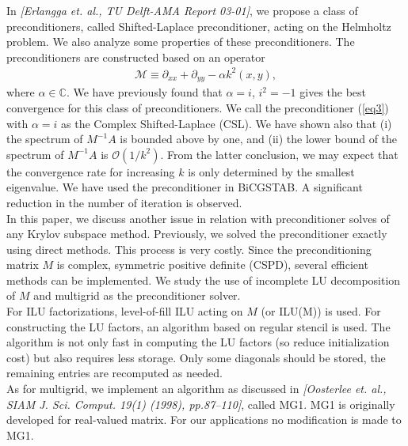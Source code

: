 \documentclass{report}
\begin{document}
In {\it [Erlangga et. al., TU Delft-AMA Report 03-01]}, we propose a
class of preconditioners, called Shifted-Laplace preconditioner, acting
on the Helmholtz problem. We also analyze some properties of these
preconditioners. The preconditioners are constructed based on an operator
\begin{eqnarray}
\mathcal{M} \equiv \partial_{xx} + \partial_{yy} - \alpha k^2(x,y), \label{eq3}
\end{eqnarray}
where $\alpha \in \mathbb{C}$. We have previously found that $\alpha =
i$, $i^2 = -1$ gives the best convergence for this class of
preconditioners. We call the preconditioner (\ref{eq3}) with $\alpha = i$
as the Complex Shifted-Laplace (CSL). We have shown also that (i) the
spectrum of $M^{-1}A$ is bounded above by one, and (ii) the lower bound
of the spectrum of $M^{-1}A$ is $\mathcal{O}(1/k^2)$. From the latter
conclusion, we may expect that the convergence rate for increasing $k$ is
only determined by the smallest eigenvalue. We have used the
preconditioner in BiCGSTAB. A significant reduction in the number of
iteration is observed. \\

In this paper, we discuss another issue in relation with preconditioner
solves of any Krylov subspace method. Previously, we solved the
preconditioner exactly using direct methods. This process is very costly.
Since the preconditioning matrix $M$ is complex, symmetric positive
definite (CSPD), several efficient methods can be implemented. We study
the use of incomplete LU decomposition of $M$ and multigrid as the
preconditioner solver. \\

For ILU factorizations, level-of-fill ILU acting on $M$ (or ILU(M)) is
used. For constructing the LU factors, an algorithm based on regular
stencil is used. The algorithm is not only fast in computing the LU
factors (so reduce initialization cost) but also requires less storage.
Only some diagonals should be stored, the remaining entries are
recomputed as needed. \\

As for multigrid, we implement an algorithm as discussed in {\it
[Oosterlee et. al., SIAM J. Sci. Comput. 19(1) (1998), pp.87--110]},
called MG1. MG1 is originally developed for real-valued matrix. For our
applications no modification is made to MG1. \\
\end{document}
